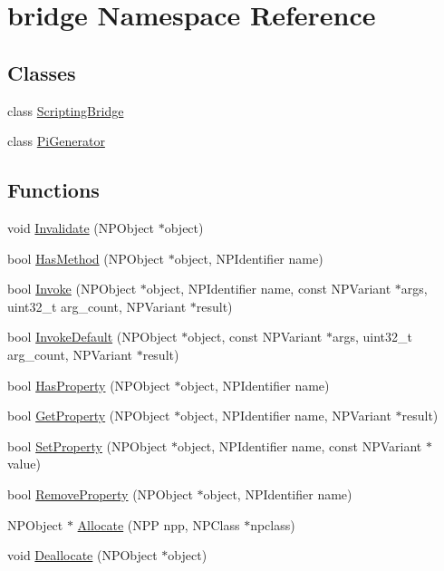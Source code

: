 \hypertarget{namespacebridge}{
\section{bridge Namespace Reference}
\label{namespacebridge}
}
\subsection*{Classes}
\begin{DoxyCompactItemize}
\item 
class \hyperlink{classbridge_1_1_scripting_bridge}{ScriptingBridge}
\item 
class \hyperlink{classbridge_1_1_pi_generator}{PiGenerator}
\end{DoxyCompactItemize}
\subsection*{Functions}
\begin{DoxyCompactItemize}
\item 
void \hyperlink{namespacebridge_a5f416ee5de0e9e087f534db44feaae50}{Invalidate} (NPObject $\ast$object)
\item 
bool \hyperlink{namespacebridge_a7c2e2883ad7956550e796e9c302f52af}{HasMethod} (NPObject $\ast$object, NPIdentifier name)
\item 
bool \hyperlink{namespacebridge_a97317adbb62abc1208a12dc477848ae9}{Invoke} (NPObject $\ast$object, NPIdentifier name, const NPVariant $\ast$args, uint32\_\-t arg\_\-count, NPVariant $\ast$result)
\item 
bool \hyperlink{namespacebridge_abb680eea58acf1fbd1c8f90da763b6eb}{InvokeDefault} (NPObject $\ast$object, const NPVariant $\ast$args, uint32\_\-t arg\_\-count, NPVariant $\ast$result)
\item 
bool \hyperlink{namespacebridge_a1f13aed843891d4bb1f74a128c8a01a6}{HasProperty} (NPObject $\ast$object, NPIdentifier name)
\item 
bool \hyperlink{namespacebridge_a11a494eb8aee0e3358e49c0a07180cd5}{GetProperty} (NPObject $\ast$object, NPIdentifier name, NPVariant $\ast$result)
\item 
bool \hyperlink{namespacebridge_a3a8e9ff89a4e1fee4909b714d917d846}{SetProperty} (NPObject $\ast$object, NPIdentifier name, const NPVariant $\ast$value)
\item 
bool \hyperlink{namespacebridge_a1f8e83225badcdeba8cb594151ef4f7d}{RemoveProperty} (NPObject $\ast$object, NPIdentifier name)
\item 
NPObject $\ast$ \hyperlink{namespacebridge_ae58f18af3f934ea07927cad4684a2268}{Allocate} (NPP npp, NPClass $\ast$npclass)
\item 
void \hyperlink{namespacebridge_a86398e4bdb21e998ec4253665b85a921}{Deallocate} (NPObject $\ast$object)
\end{DoxyCompactItemize}


